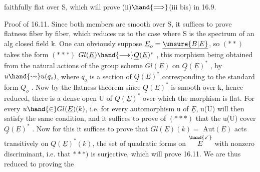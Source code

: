 
faithfully flat over S, which will prove (ii)$\hand{\Longrightarrow}$(iii bis) in 16.9.

Proof of 16.11. Since both members are smooth over S,
it suffices to prove flatness fiber by fiber, which reduces us to the
case where S is the spectrum of an alg closed field k. One can  obviously suppose
$\underline{E}_o=\underline{\unsure{B|E}}$, so $(**)$ takes the form
$(***)$   $Gl(\underline{E})\hand{\longrightarrow}\underline{Q}(\underline{E})^*$ ,
this morphism being obtained from the natural actions of the group scheme
$Gl(\underline{E})$ on $\underline{Q}(\underline{E})^*$ , by $u\hand{\rightsquigarrow} u(q_o)$, where $q_o$ is a section of $\underline{Q}(\underline{E})^*$ corresponding
to the standard form $Q_o$ . Now by the  flatness theorem\hand{,}
since $\underline{Q}(\underline{E})^*$ is smooth over k, hence reduced, there is a dense open U of
$\underline{Q}(\underline{E})^*$ over which the  morphism is flat. For every 
$u\hand{\in}Gl(\underline{E})(k)$, i.e. for every automorphism u of $\underline{E}$, u(U) will then
satisfy the same condition, and it suffices\hand{$\unsure{\leftarrow}$} to prove\hand{,} \hand{$\downarrow$}
of $(***)$\hand{,} that the u(U) cover $\underline{Q}(\underline{E})^*$ . Now for this it suffices to prove
that $Gl(\underline{E})(k)=$ Aut$(\underline{E})$ acts transitively on $\underline{Q}(\underline{E})^*(k)$, the set of
quadratic forms  on $\overset{\hand{\checkmark}}{E}$ with nonzero discriminant,  i.e. that
$***)$ is surjective, which will  prove 16.11. We are thus reduced to
proving the

